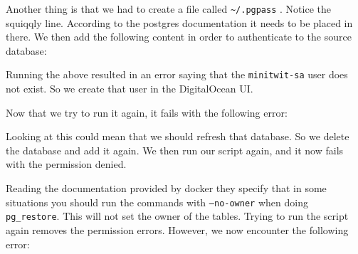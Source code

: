Another thing is that we had to create a file called \texttt{\textasciitilde{}/.pgpass} . Notice the squiqqly line. According to the postgres documentation it needs to be placed in there. We then add the following content in order to authenticate to the source database:


Running the above resulted in an error saying that the \texttt{minitwit-sa} user does not exist. So we create that user in the DigitalOcean UI.

Now that we try to run it again, it fails with the following error:




Looking at this could mean that we should refresh that database. So we delete the database and add it again. We then run our script again, and it now fails with the permission denied.

Reading the documentation provided by docker they specify that in some situations you should run the commands with \texttt{—no-owner} when doing \texttt{pg\_restore}. This will not set the owner of the tables. Trying to run the script again removes the permission errors. However, we now encounter the following error:

